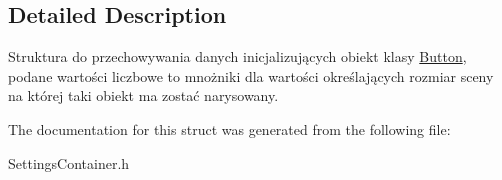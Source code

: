 \subsection{Detailed Description}
Struktura do przechowywania danych inicjalizujących obiekt klasy \mbox{\hyperlink{class_button}{Button}}, podane wartości liczbowe to mnożniki dla wartości określających rozmiar sceny na której taki obiekt ma zostać narysowany. 

The documentation for this struct was generated from the following file\+:\begin{DoxyCompactItemize}
\item 
Settings\+Container.\+h\end{DoxyCompactItemize}
